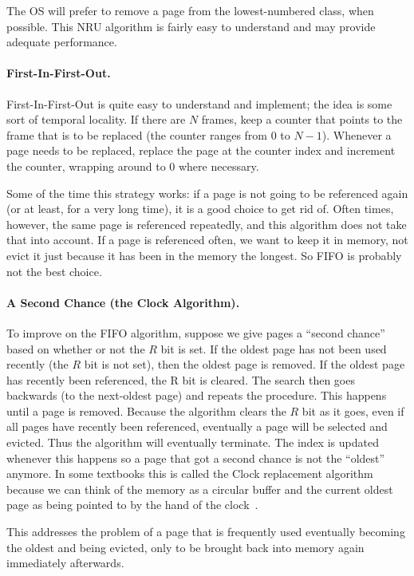 The OS will prefer to remove a page from the lowest-numbered class, when possible. This NRU algorithm is fairly easy to understand and may provide adequate performance.

\paragraph{First-In-First-Out.}
First-In-First-Out is quite easy to understand and implement; the idea is some sort of temporal locality. If there are $N$ frames, keep a counter that points to the frame that is to be replaced (the counter ranges from $0$ to $N-1$). Whenever a page needs to be replaced, replace the page at the counter index and increment the counter, wrapping around to 0 where necessary.

Some of the time this strategy works: if a page is not going to be referenced again (or at least, for a very long time), it is a good choice to get rid of. Often times, however, the same page is referenced repeatedly, and this algorithm does not take that into account. If a page is referenced often, we want to keep it in memory, not evict it just because it has been in the memory the longest. So FIFO is probably not the best choice.

\paragraph{A Second Chance (the Clock Algorithm).} 
To improve on the FIFO algorithm, suppose we give pages a ``second chance'' based on whether or not the $R$ bit is set. If the oldest page has not been used recently (the $R$ bit is not set), then the oldest page is removed. If the oldest page has recently been referenced, the R bit is cleared. The search then goes backwards (to the next-oldest page) and repeats the procedure. This happens until a page is removed. Because the algorithm clears the $R$ bit as it goes, even if all pages have recently been referenced, eventually a  page will be selected and evicted. Thus the algorithm will eventually terminate. The index is updated whenever this happens so a page that got a second chance is not the ``oldest'' anymore. In some textbooks this is called the Clock replacement algorithm because we can think of the memory as a circular buffer and the current oldest page as being pointed to by the hand of the clock~\cite{mos}.

This addresses the problem of a page that is frequently used eventually becoming the oldest and being evicted, only to be brought back into memory again immediately afterwards.

